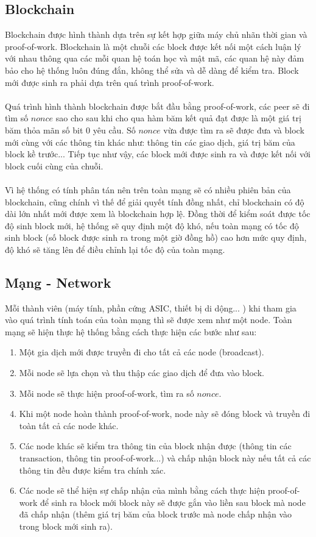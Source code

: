 \subsection{Blockchain}
Blockchain được hình thành dựa trên sự kết hợp giữa máy chủ nhãn thời gian và proof-of-work. Blockchain 
là một chuỗi các block được kết nối một cách luận lý với nhau thông qua các mỗi
quan hệ toán học và mật mã, các quan hệ này đảm bảo cho hệ thống luôn đúng đắn,
không thể sửa và dễ dàng để kiểm tra. Block mới được sinh ra phải dựa trên quá
trình proof-of-work.\\\\
Quá trình hình thành blockchain được bắt đầu bằng proof-of-work, các peer sẽ đi
tìm số $nonce$ sao cho sau khi cho qua hàm băm kết quả đạt được là một giá trị 
băm thỏa mãn số bit 0 yêu cầu. Số $nonce$ vừa được tìm ra sẽ được đưa và block
mới cùng với các thông tin khác như: thông tin các giao dịch, giá trị băm của 
block kề trước... Tiếp tục như vậy, các block mới được sinh ra và được kết nối 
với block cuối cùng của chuỗi.\\\\
Vì hệ thống có tính phân tán nên trên toàn mạng sẽ có nhiều phiên bản của blockchain,
cũng chính vì thế để giải quyết tính đồng nhất, chỉ blockchain có độ dài lớn 
nhất mới được xem là blockchain hợp lệ. Đồng thời để kiểm soát được tốc độ sinh
block mới, hệ thống sẽ quy định một độ khó, nếu toàn mạng có tốc độ sinh block 
(số block được sinh ra trong một giờ đồng hồ) cao hơn mức quy định, độ khó sẽ tăng lên 
để điều chỉnh lại tốc độ của toàn mạng.
\subsection{Mạng - Network}
Mỗi thành viên (máy tính, phần cứng ASIC, thiết bị di dộng... ) khi tham gia vào quá 
trình tính toán của toàn mạng thì sẽ được xem như một node. Toàn mạng sẽ hiện thực hệ 
thống bằng cách thực hiện các bước như sau:
\begin{enumerate}
\item Một gia dịch mới được truyền đi cho tất cả các node (broadcast).
\item Mỗi node sẽ lựa chọn và thu thập các giao dịch để đưa vào block.
\item Mỗi node sẽ thực hiện proof-of-work, tìm ra số $nonce$.
\item Khi một node hoàn thành proof-of-work, node này sẽ đóng block và truyền 
đi toàn tất cả các node khác.
\item Các node khác sẽ kiểm tra thông tin của block nhận được (thông tin các 
transaction, thông tin proof-of-work...) và chấp nhận block này nếu tất cả 
các thông tin đều được kiểm tra chính xác.
\item Các node sẽ thể hiện sự chấp nhận của mình bằng cách thực hiện proof-of-work 
để sinh ra block mới block này sẽ được gắn vào liền sau block mà node đã chấp nhận 
(thêm giá trị băm của block trước mà node chấp nhận vào trong block mới sinh ra).
\end{enumerate}


